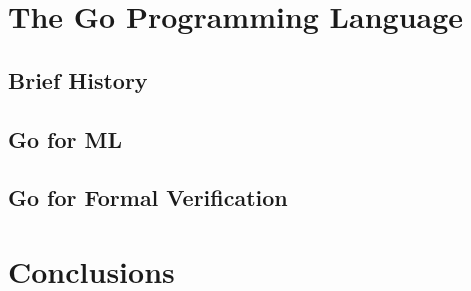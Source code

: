 \section{The Go Programming Language}

\subsection{Brief History}
\subsection{Go for ML}
\subsection{Go for Formal Verification}

\section{Conclusions}
